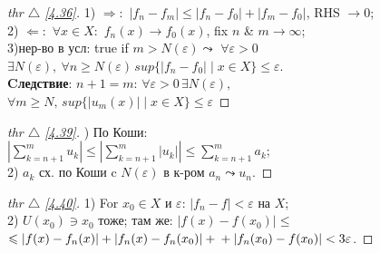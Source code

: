 
\begin{minipage}[]{0.45\textwidth}
\begin{proof}[
thr $\triangle$
\eqref{4.36}]

\phantom{42}
\noindent
 
 1) $\Rightarrow:$ $|f_n - f_m| \leq |f_n - f_0| + |f_m - f_0|$, RHS $\to 0$;\\
 2) $\Leftarrow:$ $\forall x\in X:$ $f_n(x) \to f_0(x)$, fix $n$ \& $m \to \infty$;\\
 3)нер-во в усл: true if $m > N(\varepsilon) \leadsto$ $\forall \varepsilon > 0$\\
 $\exists N(\varepsilon),\: \forall n \geq N(\varepsilon)\, sup\{ |f_n - f_0| \mid x \in X\} \leq \varepsilon$.\\


\textbf{Cледствие}: $n+1 = m$: $\forall \varepsilon > 0 \, \exists N(\varepsilon),\:$\\
$\forall m \geq N,\, sup\{ |u_m(x)| \mid x \in X\} \leq \varepsilon$

\end{proof}
\end{minipage}
\hfill
\begin{minipage}[]{0.45\textwidth}
\begin{proof}[
 thr $\triangle$
\eqref{4.39}]

\phantom{42}
) По Коши:\\ $\left| \sum\limits_{ k=n+1 }^{ m } u_k \right| \leq \left| \sum\limits_{ k=n+1 }^{ m } |u_k| \right| \leq \sum\limits_{ k=n+1 }^{ m } a_k$;\\
2) $a_k$ сх. по Коши c $N(\varepsilon)$ в к-ром $a_n \leadsto u_n$.

\end{proof}


\begin{proof}[
 thr $\triangle$
\eqref{4.40}]

\phantom{42}
\noindent

1) For $x_0 \in X$ и $\varepsilon$: $|f_n - f| < \varepsilon$ на $X$;\\
2) $U(x_0) \ni x_0$ тоже; там же: $|f(x)-f(x_0)|\leq$\\
$\leq |f(x) - f_n(x)| + |f_n(x) - f_n(x_0)| +\\+ |f_n(x_0) - f(x_0)| < 3\varepsilon$.

\end{proof}
\end{minipage}

